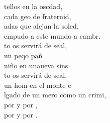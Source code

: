 \documentclass[12pt]{article}
\begin{document}
\begin{multicols*}{2}
\begin{cancion}
\jump
	tellos en la oscdad,\\
	cada geo de fraternid,\\
	adas que alejan la soled,\\
	empudo a este mundo a cambr.\\
\jump
	to os servirá de seal, \\
	un peqo pañ  \\
	niño en unaueva sins\\
	to os servirá de seal, \\
	un hom en el monte e \\
	lgado de un mero como un crimi,\\
	por  y por , \\
	por  y por .  \\
\end{cancion}%


\end{multicols*}
\end{document}

